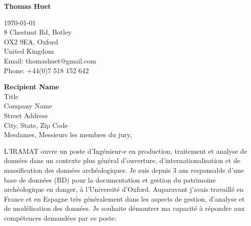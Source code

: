 
\usepackage[margin=1in]{geometry} %
\usepackage{graphicx} %
\usepackage{amsmath} %
\usepackage{amssymb}
\usepackage{enumitem} %
\usepackage{fancyhdr} %

\pagestyle{fancy}
\fancyhf{} %
\fancyfoot[R]{\thepage} %
\renewcommand{\headrulewidth}{0pt} %
\renewcommand{\footrulewidth}{0pt} %

\setlength\parindent{0pt} %



\begin{center}
    \Large\textbf{Thomas Huet} %
\end{center}

\begin{flushright}
  \today \\[12pt] %
  8 Chestnut Rd, Botley \\
  OX2 9EA, Oxford \\
  United Kingdom\\
  Email: thomashuet@gmail.com \\
  Phone: +44(0)7 518 152 642
\end{flushright}

\textbf{Recipient Name} \\
Title \\
Company Name \\
Street Address \\
City, State, Zip Code \\

Mesdames, Messieurs les membres du jury,

L'IRAMAT ouvre un poste d'Ingénieur-e en production, traitement et analyse de données dans un contexte plus général
d'ouverture, d'internationalisation et de massification des données archéologiques. Je suis depuis 3 ans responsable d'une
base de données (BD) pour la documentation et gestion du patrimoine archéologique en danger, à l'Université d'Oxford.
Auparavant j'avais travaillé en France et en Espagne très généralement dans les aspects de gestion, d'analyse et de
modélisation des données. Je souhaite démontrer ma capacité à répondre aux compétences demandées par ce
poste:

